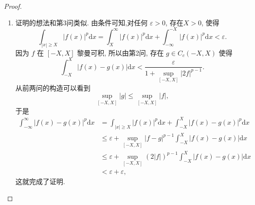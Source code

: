 \documentclass[../../main.tex]{subfiles}
\begin{document}
\begin{proof}
\begin{enumerate}[(1)]
\item 证明的想法和第3问类似. 由条件可知,对任何 $\varepsilon > 0$, 存在$X > 0$, 使得
\[
\int_{|x| \geqslant X} |f(x)|^{p}\mathrm{d}x=
\int_{X}^{\infty} |f(x)|^{p}\mathrm{d}x + \int_{-\infty}^{-X} |f(x)|^{p}\mathrm{d}x < \varepsilon.
\]
因为 $f$ 在 $[-X,X]$ 黎曼可积, 所以由第2问, 存在 $g \in C_c(-X,X)$ 使得
\[
\int_{-X}^{X} |f(x) - g(x)|\mathrm{d}x < \frac{\varepsilon}{1 + \sup_{[-X,X]} |2f|^{p - 1}}.
\]
从前两问的构造可以看到
\[
\sup_{[-X,X]} |g| \leqslant \sup_{[-X,X]} |f|,
\]
于是
\begin{align*}
\int_{-\infty}^{\infty} |f(x) - g(x)|^{p}\mathrm{d}x &= \int_{|x| \geqslant X} |f(x)|^{p}\mathrm{d}x + \int_{-X}^{X} |f(x) - g(x)|^{p}\mathrm{d}x \\
&\leqslant \varepsilon + \sup_{[-X,X]} |f - g|^{p - 1} \int_{-X}^{X} |f(x) - g(x)|\mathrm{d}x \\
&\leqslant \varepsilon + \sup_{[-X,X]} (2|f|)^{p - 1} \int_{-X}^{X} |f(x) - g(x)|\mathrm{d}x \\
&< \varepsilon + \varepsilon,
\end{align*}
这就完成了证明. 
\end{enumerate}
\end{proof}
\end{document}
